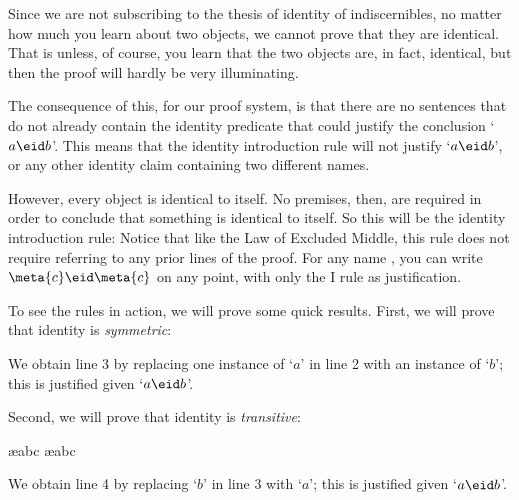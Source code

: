 Since we are not subscribing to the thesis of identity of indiscernibles, no matter how much you learn about two objects, we cannot prove that they are identical. That is unless, of course, you learn that the two objects are, in fact, identical, but then the proof will hardly be very illuminating.

The consequence of this, for our proof system, is that there are no sentences that do not already contain the identity predicate that could justify the conclusion `$a\eid b$'. This means that the identity introduction rule will not justify `$a\eid b$', or any other identity claim containing two different names.

However, every object is identical to itself. No premises, then, are required in order to conclude that something is identical to itself. So this will be the identity introduction rule:
Notice that like the Law of Excluded Middle, this rule does not require referring to any prior lines of the proof. For any name , you can write $\meta{c}\eid \meta{c}$ on any point, with only the {\eid }I rule as justification.


To see the rules in action, we will prove some quick results. First, we will prove that identity is \emph{symmetric}:
\begin{fitchproof}
	\open
	\close
\end{fitchproof}
We obtain line 3 by replacing one instance of `$a$' in line 2 with an instance of `$b$'; this is justified given `$a\eid  b$'.

Second, we will prove that identity is \emph{transitive}:
\begin{fitchproof}
	\open
		\ae{abc}
		\ae{abc}
	\close
\end{fitchproof}
We obtain line 4 by replacing `$b$' in line 3 with `$a$'; this is justified given `$a\eid  b$'.

